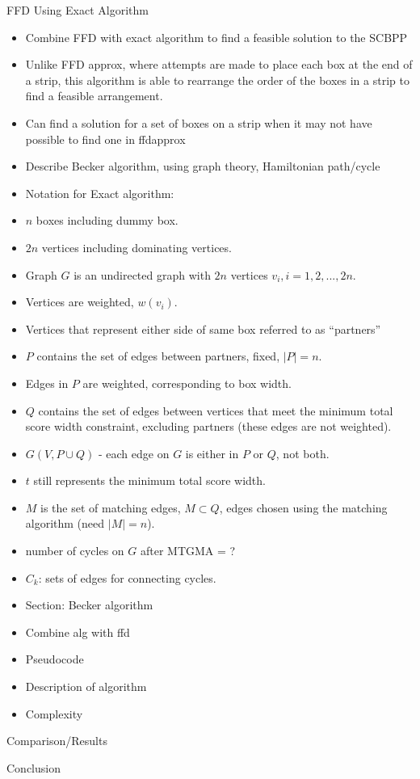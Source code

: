 \documentclass[oribibl]{llncs}
\begin{document}
FFD Using Exact Algorithm
\begin{itemize}
	\item Combine FFD with exact algorithm to find a feasible solution to the SCBPP
	\item Unlike FFD approx, where attempts are made to place each box at the end of a strip, this algorithm is able to rearrange the order of the boxes in a strip to find a feasible arrangement.
	\item Can find a solution for a set of boxes on a strip when it may not have possible to find one in ffdapprox
	\item Describe Becker algorithm, using graph theory, Hamiltonian path/cycle
	\item Notation for Exact algorithm:
	\item $n$ boxes including dummy box.
	\item $2n$ vertices including dominating vertices.
	\item Graph $G$ is an undirected graph with $2n$ vertices $v_i, i = 1, 2, ...,2n$.
	\item Vertices are weighted, $w(v_i)$.
	\item Vertices that represent either side of same box referred to as ``partners''
	\item $P$ contains the set of edges between partners, fixed, $|P| = n$.
	\item Edges in $P$ are weighted, corresponding to box width.
	\item $Q$ contains the set of edges between vertices that meet the minimum total score width constraint, excluding partners (these edges are not weighted).
	\item $G(V, P \cup Q)$ - each edge on $G$ is either in $P$ or $Q$, not both.
	\item $t$ still represents the minimum total score width.
	\item $M$ is the set of matching edges, $M \subset Q$, edges chosen using the matching algorithm (need $|M| = n$).
	\item number of cycles on $G$ after MTGMA =  ?
	\item $C_k$: sets of edges for connecting cycles.
	\item Section: Becker algorithm
	\item Combine alg with ffd
	\item Pseudocode
	\item Description of algorithm
	\item Complexity
\end{itemize}

Comparison/Results

Conclusion














\end{document}
